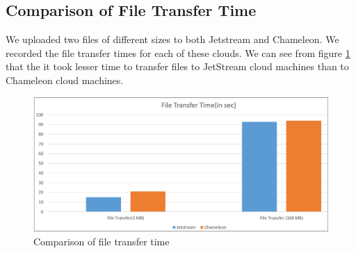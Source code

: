 \documentclass[9pt,twocolumn,twoside]{../../styles/osajnl}
\begin{document}
\subsection{Comparison of File Transfer Time}

We uploaded two files of different sizes to both Jetstream and Chameleon. We recorded the file transfer times for each of these clouds. We can see from figure \ref{fig:ftt} that the it took lesser time to transfer files to JetStream cloud machines than to Chameleon cloud machines.

\begin{figure}[h]
	\centering
	\includegraphics[scale=0.33]{images/Filetransfer.png}
	\caption{Comparison of file transfer time}
	\label{fig:ftt}
\end{figure}
\end{document}
